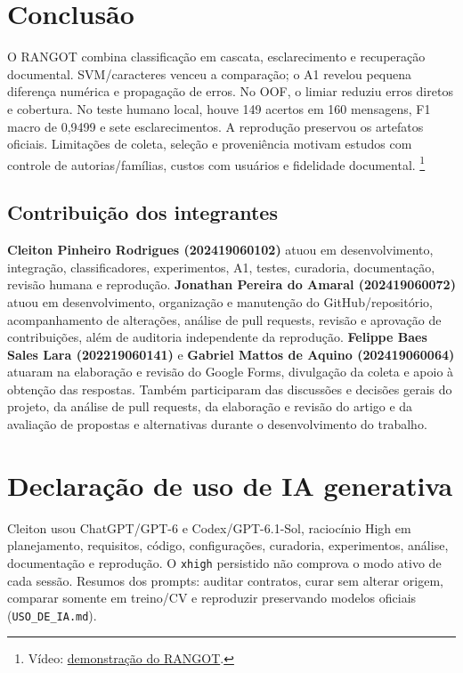 \documentclass[12pt]{article}
\begin{document}
\section{Conclusão}
O RANGOT combina classificação em cascata, esclarecimento e recuperação documental.
SVM/caracteres venceu a comparação; o A1 revelou pequena diferença numérica
e propagação de erros. No OOF, o limiar reduziu erros diretos e cobertura.
No teste humano local, houve 149 acertos em 160 mensagens,
F1 macro de 0,9499 e sete esclarecimentos.
A reprodução preservou os artefatos oficiais. Limitações de coleta, seleção
e proveniência motivam estudos com controle de autorias/famílias, custos com
usuários e fidelidade documental.
\footnote{Vídeo: \href{https://www.youtube.com/watch?v=GYhiJRu9faM}{demonstração do RANGOT}.}

\subsection*{Contribuição dos integrantes}
\textbf{Cleiton Pinheiro Rodrigues (202419060102)} atuou em desenvolvimento,
integração, classificadores, experimentos, A1, testes, curadoria, documentação,
revisão humana e reprodução.
\textbf{Jonathan Pereira do Amaral (202419060072)} atuou em desenvolvimento,
organização e manutenção do GitHub/repositório, acompanhamento de alterações,
análise de pull requests, revisão e aprovação de contribuições, além de auditoria
independente da reprodução.
\textbf{Felippe Baes Sales Lara (202219060141)} e
\textbf{Gabriel Mattos de Aquino (202419060064)} atuaram na elaboração e revisão
do Google Forms, divulgação da coleta e apoio à obtenção das
respostas. Também participaram das discussões e decisões gerais do projeto,
da análise de pull requests, da elaboração e revisão do artigo e da avaliação
de propostas e alternativas durante o desenvolvimento do trabalho.

\section*{Declaração de uso de IA generativa}
Cleiton usou ChatGPT/GPT-6 e Codex/GPT-6.1-Sol, raciocínio High em planejamento, requisitos, código, configurações,
curadoria, experimentos, análise, documentação e reprodução.
O \texttt{xhigh} persistido não comprova o modo ativo de cada sessão.
Resumos dos prompts: auditar contratos, curar sem alterar origem, comparar
somente em treino/CV e reproduzir preservando modelos oficiais
(\texttt{USO\_DE\_IA.md}).
\end{document}

